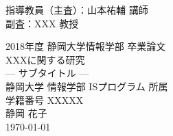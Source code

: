 \documentclass[a4paper,12pt,oneside,openany,autodetect-engine,dvipdfmx,platex]{jsreport}
\newcommand{\ChangeHeaderRule}{%
     \let\subsubsection\subsection
     \let\subsection\section
     \let\section\chapter
}
\begin{document}
\begin{titlepage}
\begin{flushright}
指導教員（主査）：山本祐輔 講師\\
副査：XXX 教授
\end{flushright}
\begin{center}
\vspace*{80pt}
{\large 2018年度 静岡大学情報学部 卒業論文}\\

\vspace*{40pt}
{\huge XXXに関する研究}\\
\vspace{10pt}
{\Large --- サブタイトル ---}\\
\vfill
{静岡大学 情報学部 ISプログラム 所属}\\
{学籍番号 XXXXX}\\
\vspace{20pt}
{静岡 花子}\\
\vspace{20pt}
{\today}\\
\end{center}
\vfill
\end{titlepage}


\begin{abstract}

\end{abstract}


\tableofcontents

\newpage
\listoffigures
\listoftables








\ChangeHeaderRule












\end{document}

